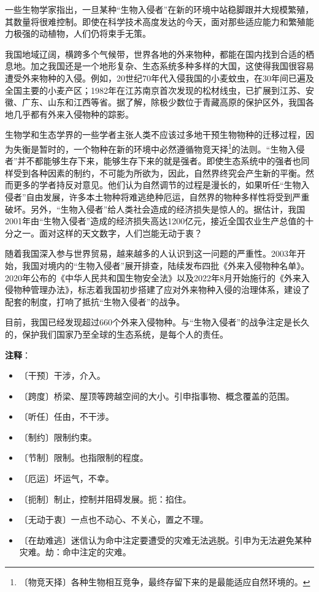 \documentclass[12pt,UTF-8,openany]{ctexbook}
\begin{document}
\begin{large}
    一些生物学家指出，一旦某种“生物入侵者”在新的环境中站稳脚跟并大规模繁殖，其数量将很难控制。即使在科学技术高度发达的今天，面对那些适应能力和繁殖能力极强的动植物，人们仍将束手无策。
    
    我国地域辽阔，横跨多个气候带，世界各地的外来物种，都能在国内找到合适的栖息地。加之我国还是一个地形复杂、生态系统多种多样的大国，这使得我国很容易遭受外来物种的入侵。例如，20世纪70年代入侵我国的小麦蚊虫，在30年间已遍及全国主要的小麦产区；1982年在江苏南京首次发现的松材线虫，已扩展到江苏、安徽、广东、山东和江西等省。据了解，除极少数位于青藏高原的保护区外，我国各地几乎都有外来入侵物种的踪影。
    
    生物学和生态学界的一些学者主张人类不应该过多地干预生物物种的迁移过程，因为失衡是暂时的，一个物种在新的环境中必然遵循物竞天择\footnote{〔物竞天择〕各种生物相互竞争，最终存留下来的是最能适应自然环境的。}的法则。“生物入侵者”并不都能够生存下来，能够生存下来的就是强者。即使生态系统中的强者也同样受到各种因素的制约，不可能为所欲为，因此，自然界终究会产生新的平衡。然而更多的学者持反对意见。他们认为自然调节的过程是漫长的，如果听任“生物入侵者”自由发展，许多本土物种将难逃绝种厄运，自然界的物种多样性将受到严重破坏。另外，“生物入侵者”给人类社会造成的经济损失是惊人的。据估计，我国2001年由“生物入侵者”造成的经济损失高达1200亿元，接近全国农业生产总值的十分之一。面对这样的天文数字，人们岂能无动于衷？
    
    随着我国深入参与世界贸易，越来越多的人认识到这一问题的严重性。2003年开始，我国对境内的“生物入侵者”展开排查，陆续发布四批《外来入侵物种名单》。2020年公布的《中华人民共和国生物安全法》以及2022年8月开始施行的《外来入侵物种管理办法》，标志着我国初步搭建了应对外来物种入侵的治理体系，建设了配套的制度，打响了抵抗“生物入侵者”的战争。
    
    目前，我国已经发现超过660个外来入侵物种。与“生物入侵者”的战争注定是长久的，保护我们国家乃至全球的生态系统，是每个人的责任。
    
\end{large}


\newpage

\textbf{注释}：

\vspace{-1em}

\begin{itemize}
    \setlength\itemsep{-0.2em}
    \item 〔干预〕干涉，介入。
    \item 〔跨度〕桥梁、屋顶等跨越空间的大小。引申指事物、概念覆盖的范围。
    \item 〔听任〕任由，不干涉。
    \item 〔制约〕限制约束。
    \item 〔节制〕限制。也指限制的程度。
    \item 〔厄运〕坏运气，不幸。
    \item 〔扼制〕制止，控制并阻碍发展。扼：掐住。
    \item 〔无动于衷〕一点也不动心、不关心，置之不理。
    \item 〔在劫难逃〕迷信认为命中注定要遭受的灾难无法逃脱。引申为无法避免某种灾难。劫：命中注定的灾难。
\end{itemize}
\end{document}
